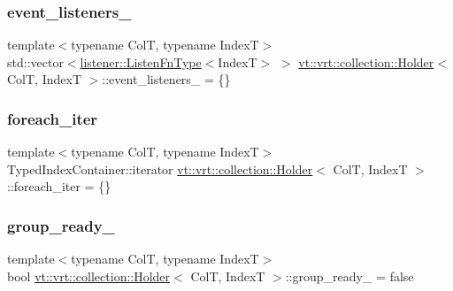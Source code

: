 \subsubsection{\texorpdfstring{event\+\_\+listeners\+\_\+}{event\_listeners\_}}
{\footnotesize\ttfamily template$<$typename ColT, typename IndexT$>$ \\
std\+::vector$<$\hyperlink{namespacevt_1_1vrt_1_1collection_1_1listener_a62d04c44a3c187eae66bdba2090b4505}{listener\+::\+Listen\+Fn\+Type}$<$IndexT$>$ $>$ \hyperlink{structvt_1_1vrt_1_1collection_1_1_holder}{vt\+::vrt\+::collection\+::\+Holder}$<$ ColT, IndexT $>$\+::event\+\_\+listeners\+\_\+ = \{\}\hspace{0.3cm}{\ttfamily [private]}}

\mbox{\label{structvt_1_1vrt_1_1collection_1_1_holder_a1b21c6d5b8b0bce316afe9b60e80d621}} 
\subsubsection{\texorpdfstring{foreach\+\_\+iter}{foreach\_iter}}
{\footnotesize\ttfamily template$<$typename ColT, typename IndexT$>$ \\
Typed\+Index\+Container\+::iterator \hyperlink{structvt_1_1vrt_1_1collection_1_1_holder}{vt\+::vrt\+::collection\+::\+Holder}$<$ ColT, IndexT $>$\+::foreach\+\_\+iter = \{\}\hspace{0.3cm}{\ttfamily [private]}}

\mbox{\label{structvt_1_1vrt_1_1collection_1_1_holder_ad4041accaac66318b6ddc027f9730d32}} 
\subsubsection{\texorpdfstring{group\+\_\+ready\+\_\+}{group\_ready\_}}
{\footnotesize\ttfamily template$<$typename ColT, typename IndexT$>$ \\
bool \hyperlink{structvt_1_1vrt_1_1collection_1_1_holder}{vt\+::vrt\+::collection\+::\+Holder}$<$ ColT, IndexT $>$\+::group\+\_\+ready\+\_\+ = false\hspace{0.3cm}{\ttfamily [private]}}

